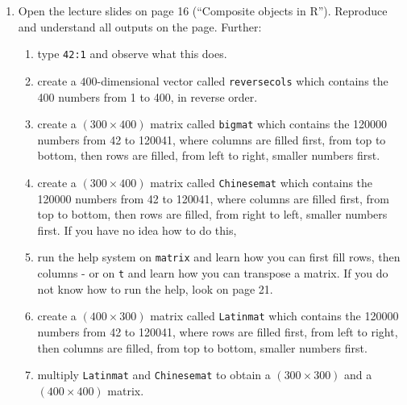 \begin{enumerate}
\item Open the lecture slides on page 16 (``Composite objects in R''). Reproduce and understand all outputs on the page. Further:
\begin{enumerate}
\item type \texttt{42:1} and observe what this does. 
\item create a $400$-dimensional vector called \texttt{reversecols} which contains the 400 numbers from 1 to 400, in reverse order.
\item create a $(300 \times 400)$ matrix called \texttt{bigmat} which contains the 120000 numbers from 42 to 120041, where columns are filled first, from top to bottom, then rows are filled, from left to right, smaller numbers first.
\item create a $(300 \times 400)$ matrix called \texttt{Chinesemat} which contains the 120000 numbers from 42 to 120041, where columns are filled first, from top to bottom, then rows are filled, from right to left, smaller numbers first. If you have no idea how to do this,
\item run the help system on \texttt{matrix} and learn how you can first fill rows, then columns - or on \texttt{t} and learn how you can transpose a matrix. If you do not know how to run the help, look on page 21.
\item create a $(400 \times 300)$ matrix called \texttt{Latinmat} which contains the 120000 numbers from 42 to 120041, where rows are filled first, from left to right, then columns are filled, from top to bottom, smaller numbers first.
\item multiply \texttt{Latinmat} and \texttt{Chinesemat} to obtain a $(300 \times 300)$ and a $(400\times 400)$ matrix.
\end{enumerate}


\end{enumerate}
